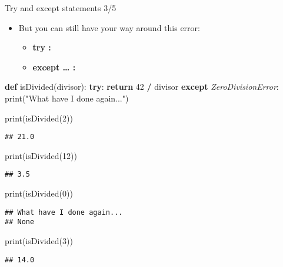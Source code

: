 \documentclass[
  8pt,
  ignorenonframetext,
]{beamer}
\newenvironment{Shaded}{\begin{snugshade}}{\end{snugshade}}
\newcommand{\BuiltInTok}[1]{#1}
\newcommand{\ControlFlowTok}[1]{\textcolor[rgb]{0.13,0.29,0.53}{\textbf{#1}}}
\newcommand{\DecValTok}[1]{\textcolor[rgb]{0.00,0.00,0.81}{#1}}
\newcommand{\KeywordTok}[1]{\textcolor[rgb]{0.13,0.29,0.53}{\textbf{#1}}}
\newcommand{\NormalTok}[1]{#1}
\newcommand{\OperatorTok}[1]{\textcolor[rgb]{0.81,0.36,0.00}{\textbf{#1}}}
\newcommand{\PreprocessorTok}[1]{\textcolor[rgb]{0.56,0.35,0.01}{\textit{#1}}}
\newcommand{\StringTok}[1]{\textcolor[rgb]{0.31,0.60,0.02}{#1}}
\providecommand{\tightlist}{%
  \setlength{\itemsep}{0pt}\setlength{\parskip}{0pt}}
\begin{document}
\begin{frame}[fragile]{Try and except statements 3/5}
\protect\hypertarget{try-and-except-statements-35}{}
\begin{itemize}
\tightlist
\item
  But you can still have your way around this error:

  \begin{itemize}
  \tightlist
  \item
    \textbf{try : }
  \item
    \textbf{except \ldots{} : }
  \end{itemize}
\end{itemize}

\begin{Shaded}
\begin{Highlighting}[]
\KeywordTok{def}\NormalTok{ isDivided(divisor):}
    \ControlFlowTok{try}\NormalTok{:}
      \ControlFlowTok{return} \DecValTok{42} \OperatorTok{/}\NormalTok{ divisor}
    \ControlFlowTok{except} \PreprocessorTok{ZeroDivisionError}\NormalTok{:}
      \BuiltInTok{print}\NormalTok{(}\StringTok{"What have I done again..."}\NormalTok{)}

\BuiltInTok{print}\NormalTok{(isDivided(}\DecValTok{2}\NormalTok{))}
\end{Highlighting}
\end{Shaded}

\begin{verbatim}
## 21.0
\end{verbatim}

\begin{Shaded}
\begin{Highlighting}[]
\BuiltInTok{print}\NormalTok{(isDivided(}\DecValTok{12}\NormalTok{))}
\end{Highlighting}
\end{Shaded}

\begin{verbatim}
## 3.5
\end{verbatim}

\begin{Shaded}
\begin{Highlighting}[]
\BuiltInTok{print}\NormalTok{(isDivided(}\DecValTok{0}\NormalTok{))}
\end{Highlighting}
\end{Shaded}

\begin{verbatim}
## What have I done again...
## None
\end{verbatim}

\begin{Shaded}
\begin{Highlighting}[]
\BuiltInTok{print}\NormalTok{(isDivided(}\DecValTok{3}\NormalTok{))}
\end{Highlighting}
\end{Shaded}

\begin{verbatim}
## 14.0
\end{verbatim}
\end{frame}
\end{document}
